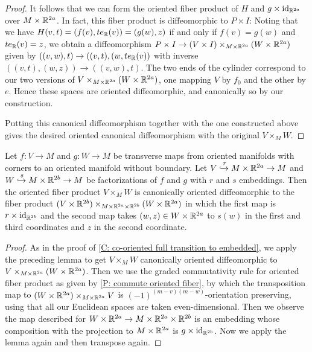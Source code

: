 \begin{proof}
It follows that we can form the oriented fiber product of $H$ and $g\times\mathrm{id}_{\mathbb{R}^{2a}}$ over $M\times \mathbb{R}^{2a}$.  In fact, this fiber product is diffeomorphic to $P\times I$: Noting that we have $H(v,t)=(f(v),te_{\mathbb{R}}(v))=(g(w),z)$ if and only if $f(v)=g(w)$ and $te_{\mathbb{R}}(v)=z$,  we obtain a diffeomorphism $P\times I\to (V\times I)\times_{M\times \mathbb{R}^{2a}}(W\times \mathbb{R}^{2a})$ given by $((v,w),t)\to ((v,t),(w, te_{\mathbb{R}}(v))$ with inverse $((v,t),(w,z))\to ((v,w),t)$. The two ends of the cylinder correspond to our two versions of $V\times_{M\times \mathbb{R}^{2a}} (W\times \mathbb{R}^{2a})$, one mapping $V$ by $f_0$ and the other by $e$. Hence these spaces are oriented diffeomorphic, and canonically so by our construction.

Putting this canonical diffeomorphism together with the one constructed above gives the desired oriented canonical diffeomorphism with the original $V\times_M W$.
\end{proof}

\begin{corollary}\label{C: oriented full transition to embedded}
Let $f:V\to M$ and $g:W\to M$ be transverse  maps from oriented manifolds with corners to an oriented manifold without boundary.  Let $V\xhookrightarrow{r} M\times \mathbb{R}^{2a}\to M$ and $W\xhookrightarrow{s} M\times \mathbb{R}^{2b}\to M$ be factorizations of $f$ and $g$ with $r$ and $s$ embeddings.
Then the oriented fiber product $V\times_M W$ is canonically oriented diffeomorphic to the fiber product $(V\times \mathbb{R}^{2b})\times_{M\times \mathbb{R}^{2a}\times \mathbb{R}^{2b}}(W\times \mathbb{R}^{2a})$ in which the first map is $r\times \mathrm{id}_{\mathbb{R}^{2b}}$ and the second map takes $(w,z)\in W\times \mathbb{R}^{2a}$ to $s(w)$ in the first and third coordinates and $z$ in the second coordinate.
\end{corollary}
\begin{proof}
As in the proof of \cref{C: co-oriented full transition to embedded},
we apply the preceding lemma to get  $V\times_M W$ canonically oriented diffeomorphic to $V\times_{M\times \mathbb{R}^{2a}}(W\times \mathbb{R}^{2a})$. Then we use the graded commutativity rule for oriented fiber product as given by \cref{P: commute oriented fiber},
 by which
 the transposition  map to $(W\times \mathbb{R}^{2a})\times_{M\times \mathbb{R}^{2a}}V$ is $(-1)^{(m-v)(m-w)}$-orientation preserving, using that all our Euclidean spaces are taken even-dimensional. Then we observe the map described for $W\times \mathbb{R}^{2a}\to M\times \mathbb{R}^{2a}\times \mathbb{R}^{2b}$ is an embedding whose composition with the projection to $M\times \mathbb{R}^{2a}$ is $g\times \mathrm{id}_{\mathbb{R}^{2b}}$.
 Now we apply the lemma again and then transpose again.
\end{proof}

